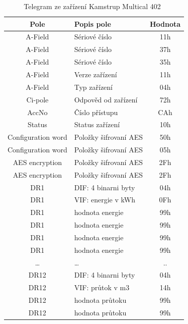 \begin{table}[!ht]
\centering
\caption{Telegram ze zařízení Kamstrup Multical 402~\cite{CidloKamstrup}}
\label{TabulkaTelegramKamstrup}
\begin{tabular}{|c|l|c|}
\hline
\textbf{Pole}      & \textbf{Popis pole}            & \textbf{Hodnota} \\ \hline \hline
A-Field            & Sériové číslo         & 11h \\ \hline
A-Field            & Sériové číslo         & 37h \\ \hline
A-Field            & Sériové číslo         & 35h \\ \hline
A-Field            & Verze zařízení        & 11h \\ \hline
A-Field            & Typ zařízení          & 04h \\ \hline
Ci-pole            & Odpověd od zařízení   & 72h \\ \hline
AccNo              & Číslo přístupu        & CAh \\ \hline
Status             & Status zařízení       & 10h \\ \hline
Configuration word & Položky šifrovaní AES & 50h \\ \hline
Configuration word & Položky šifrovaní AES & 05h \\ \hline
AES encryption     & Položky šifrovaní AES & 2Fh \\ \hline
AES encryption     & Položky šifrovaní AES & 2Fh \\ \hline
DR1                & DIF: 4 binarni byty   & 04h \\ \hline
DR1                & VIF: energie v kWh    & 0Fh \\ \hline
DR1                & hodnota energie       & 99h \\ \hline
DR1                & hodnota energie       & 99h \\ \hline
DR1                & hodnota energie       & 99h \\ \hline
DR1                & hodnota energie       & 99h \\ \hline
…                  & …                     & ..  \\ \hline
DR12               & DIF: 4 binarni byty   & 04h \\ \hline
DR12               & VIF: průtok v m3      & 14h \\ \hline
DR12               & hodnota průtoku       & 99h \\ \hline
DR12               & hodnota průtoku       & 99h \\ \hline

\end{tabular}
\end{table}
